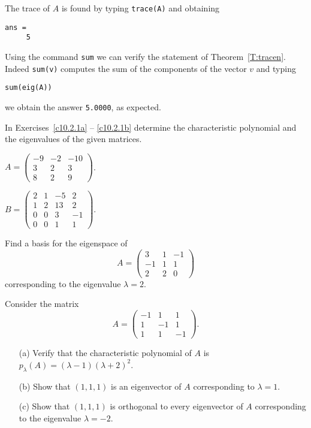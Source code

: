 \documentclass{ximera}
\begin{document}
The trace of $A$ is found by typing {\tt trace(A)} and obtaining
\begin{verbatim} 
ans =
     5
\end{verbatim} 

Using the \Matlab command {\tt sum} we can verify the statement
of Theorem~\ref{T:tracen}.  Indeed {\tt sum(v)} computes the sum 
of the components of the vector $v$ and typing
\begin{verbatim}
sum(eig(A))
\end{verbatim}
we obtain the answer {\tt 5.0000}, as expected.

\EXER

\TEXER

\noindent In Exercises~\ref{c10.2.1a} -- \ref{c10.2.1b} determine the 
characteristic polynomial and the eigenvalues of the given matrices.
\begin{exercise} \label{c10.2.1a}
$A = \left(\begin{array}{rrr} -9 & -2 & -10 \\ 3 & 2 & 3 \\
8 & 2 & 9 \end{array}\right)$. 
\end{exercise}
\begin{exercise} \label{c10.2.1b}
$B = \left(\begin{array}{rrrr} 2 & 1 & -5 & 2 \\ 1 & 2 & 13 & 2 \\
0 & 0 & 3 & -1 \\ 0 & 0 & 1 & 1 \end{array}\right)$.
\end{exercise}

\begin{exercise} \label{c10.2.2}
Find a basis for the eigenspace of 
\[
A = \left(\begin{array}{rrr} 3 & 1 & -1 \\ -1 & 1 & 1 \\ 2 & 2 & 0 
\end{array}\right)
\]
corresponding to the eigenvalue $\lambda=2$.
\end{exercise}

\begin{exercise} \label{c10.2.3}
Consider the matrix  
\[
A = \left(\begin{array}{rrr} -1 & 1 & 1 \\ 1 & -1 & 1 \\ 1 & 1 & -1 
\end{array}\right).
\]
\begin{itemize}
\item[(a)] Verify that the characteristic polynomial of $A$ is
 $p_\lambda(A)=(\lambda-1)(\lambda+2)^2$.
\item[(b)] Show that $(1,1,1)$ is an eigenvector of $A$ corresponding to 
$\lambda=1$.
\item[(c)] Show that $(1,1,1)$ is orthogonal to every eigenvector 
of $A$ corresponding to the eigenvalue $\lambda=-2$.
\end{itemize}
\end{exercise}
\end{document}
